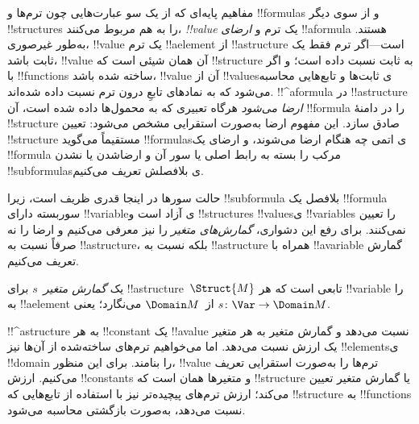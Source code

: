 \documentclass[../../../include/open-logic-section]{subfiles}
\begin{document}


\begin{explain}
مفاهیم پایه‌ای که از یک سو عبارت‌هایی چون ترم‌ها و !!{formula}s و از سوی
دیگر !!{structure}s را به هم مربوط می‌کنند، \emph{!!{value}} یک ترم و
\emph{ارضای} !!a{formula} هستند. به‌طور غیرصوری، !!{value} یک ترم
!!a{element} از !!a{structure} است---اگر ترم فقط یک ثابت باشد، !!{value}
آن همان شیئی است که !!{structure} به ثابت نسبت داده است؛ و اگر با
!!{function}s ساخته شده باشد، !!{value} آن از !!{value}sی ثابت‌ها و
تابع‌هایی محاسبه می‌شود که به نمادهای تابعِ درون ترم نسبت داده شده‌اند.
!!^a{formula} در !!a{structure} \emph{ارضا می‌شود} هرگاه تعبیری که به
محمول‌ها داده شده است، آن !!{formula} را در دامنهٔ !!{structure} صادق
سازد. این مفهوم ارضا به‌صورت استقرایی مشخص می‌شود: تعیین !!{structure}
مستقیماً می‌گوید !!{formula}sی اتمی چه هنگام ارضا می‌شوند، و ارضای یک
!!{formula} مرکب را بسته به رابط اصلی یا سور آن و ارضاشدن یا نشدن
!!{subformula}sی بلافصلش تعریف می‌کنیم.

حالت سورها در اینجا قدری ظریف است، زیرا !!{subformula} بلافصل یک
!!{formula} سوربسته دارای !!{variable}ی آزاد است و !!{structure}s
!!{value}sی !!{variable}s را تعیین نمی‌کنند. برای رفع این دشواری،
\emph{گمارش‌های متغیر} را نیز معرفی می‌کنیم و ارضا را نه صرفاً نسبت به
!!a{structure}، بلکه نسبت به !!a{structure} همراه با !!a{variable}
گمارش تعریف می‌کنیم.
\end{explain}

\begin{defn}
یک \emph{گمارش متغیر}~$s$ برای !!a{structure}~$\Struct{M}$ تابعی است که
هر !!{variable} را به !!a{element} از~$\Domain M$ می‌نگارد؛ یعنی
$s\colon \Var \to \Domain M$.
\end{defn}

\begin{explain}
!!^a{structure} به هر !!{constant} یک !!a{value} نسبت می‌دهد و گمارش
متغیر به هر متغیر یک ارزش نسبت می‌دهد. اما می‌خواهیم ترم‌های ساخته‌شده از
آن‌ها نیز !!{element}sی !!{domain} را بنامند. برای این منظور، !!{value}
ترم‌ها را به‌صورت استقرایی تعریف می‌کنیم. ارزش !!{constant}s و متغیرها
همان است که !!{structure} یا گمارش متغیر تعیین می‌کند؛ ارزش ترم‌های
پیچیده‌تر نیز با استفاده از تابع‌هایی که !!{structure} به !!{function}s
نسبت می‌دهد، به‌صورت بازگشتی محاسبه می‌شود.
\end{explain}
\end{document}
